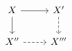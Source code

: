 \documentclass[12pt]{standalone}
\begin{document}
        $$

\begin{tikzcd} 
    X \ar[r] \ar[d] & X^\prime \ar[d,dashed] \\
    X^{\prime \prime} \ar[r,dashed] & X^{\prime \prime \prime}
\end{tikzcd}
        $$
        
\end{document}
